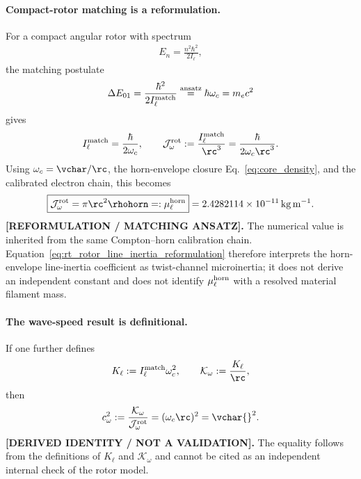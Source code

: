 \paragraph{Compact-rotor matching is a reformulation.}
For a compact angular rotor with spectrum
\begin{align}
    E_n
    =
    \frac{n^2\hbar^2}{2I_\ell},
\end{align}
the matching postulate
\begin{align}
    \Delta E_{01}
    =
    \frac{\hbar^2}{2I_\ell^{\rm match}}
    \stackrel{\rm ansatz}{=}
    \hbar\omega_c
    =
    m_ec^2
\end{align}
gives
\begin{align}
    I_\ell^{\rm match}
    =
    \frac{\hbar}{2\omega_c},
    \qquad
    \mathcal J_{\omega}^{\rm rot}
    :=
    \frac{I_\ell^{\rm match}}{\rc^3}
    =
    \frac{\hbar}{2\omega_c\rc^3}.
    \label{eq:rt_rotor_matching_microinertia}
\end{align}
Using $\omega_c=\vchar/\rc$, the horn-envelope closure
Eq.~\eqref{eq:core_density}, and the calibrated electron chain, this becomes
\begin{align}
    \boxed{
    \mathcal J_{\omega}^{\rm rot}
    =
    \pi\rc^2\rhohorn
    =:
    \mu_{\ell}^{\rm horn}
    }
    =
    2.4282114\times10^{-11}\,\mathrm{kg\,m^{-1}}.
    \label{eq:rt_rotor_line_inertia_reformulation}
\end{align}
\textbf{[REFORMULATION / MATCHING ANSATZ].}
The numerical value is inherited from the same Compton--horn calibration
chain.  Equation~\eqref{eq:rt_rotor_line_inertia_reformulation} therefore
interprets the horn-envelope line-inertia coefficient as twist-channel
microinertia; it does not derive an independent constant and does not identify
$\mu_{\ell}^{\rm horn}$ with a resolved material filament mass.

\paragraph{The wave-speed result is definitional.}
If one further defines
\begin{align}
    K_\ell
    :=
    I_\ell^{\rm match}\omega_c^2,
    \qquad
    \mathcal K_\omega
    :=
    \frac{K_\ell}{\rc},
\end{align}
then
\begin{align}
    c_\omega^2
    :=
    \frac{\mathcal K_\omega}{\mathcal J_{\omega}^{\rm rot}}
    =
    (\omega_c\rc)^2
    =
    \vchar{}^2.
    \label{eq:rt_rotor_speed_tautology}
\end{align}
\textbf{[DERIVED IDENTITY / NOT A VALIDATION].}
The equality follows from the definitions of $K_\ell$ and
$\mathcal K_\omega$ and cannot be cited as an independent internal check of
the rotor model.

